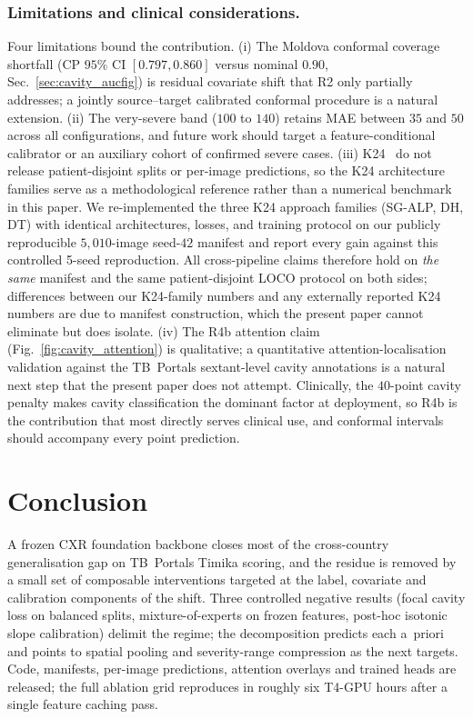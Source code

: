\documentclass[runningheads]{llncs}
\begin{document}
\subsubsection{Limitations and clinical considerations.}
Four limitations bound the contribution. (i) The Moldova conformal coverage shortfall (CP $95\%$ CI $[0.797,0.860]$ versus nominal $0.90$, Sec.~\ref{sec:cavity_aucfig}) is residual covariate shift that R2 only partially addresses; a jointly source--target calibrated conformal procedure is a natural extension. (ii) The very-severe band ($100$ to $140$) retains MAE between $35$ and $50$ across all configurations, and future work should target a feature-conditional calibrator or an auxiliary cohort of confirmed severe cases. (iii) K24~\cite{kantipudi2024} do not release patient-disjoint splits or per-image predictions, so the K24 architecture families serve as a methodological reference rather than a numerical benchmark in this paper. We re-implemented the three K24 approach families (SG-ALP, DH, DT) with identical architectures, losses, and training protocol on our publicly reproducible $5{,}010$-image seed-$42$ manifest and report every gain against this controlled 5-seed reproduction. All cross-pipeline claims therefore hold on \emph{the same} manifest and the same patient-disjoint LOCO protocol on both sides; differences between our K24-family numbers and any externally reported K24 numbers are due to manifest construction, which the present paper cannot eliminate but does isolate. (iv) The R4b attention claim (Fig.~\ref{fig:cavity_attention}) is qualitative; a quantitative attention-localisation validation against the TB~Portals sextant-level cavity annotations is a natural next step that the present paper does not attempt. Clinically, the $40$-point cavity penalty makes cavity classification the dominant factor at deployment, so R4b is the contribution that most directly serves clinical use, and conformal intervals should accompany every point prediction.

\section{Conclusion}

A frozen CXR foundation backbone closes most of the cross-country generalisation gap on TB~Portals Timika scoring, and the residue is removed by a small set of composable interventions targeted at the label, covariate and calibration components of the shift. Three controlled negative results (focal cavity loss on balanced splits, mixture-of-experts on frozen features, post-hoc isotonic slope calibration) delimit the regime; the decomposition predicts each a~priori and points to spatial pooling and severity-range compression as the next targets. Code, manifests, per-image predictions, attention overlays and trained heads are released; the full ablation grid reproduces in roughly six T4-GPU hours after a single feature caching pass.
\end{document}
